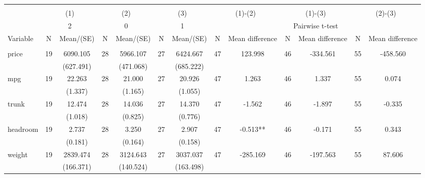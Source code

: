 
\begin{tabular}{@{\extracolsep{5pt}}lcccccccccccc}
\\[-1.8ex]\hline \hline \\[-1.8ex]
 & \multicolumn{2}{c}{(1)}  & \multicolumn{2}{c}{(2)}  & \multicolumn{2}{c}{(3)}  & \multicolumn{2}{c}{(1)-(2)} & \multicolumn{2}{c}{(1)-(3)} & \multicolumn{2}{c}{(2)-(3)} \\
 & \multicolumn{2}{c}{2}  & \multicolumn{2}{c}{0}  & \multicolumn{2}{c}{1}  & \multicolumn{6}{c}{Pairwise t-test}  \\
Variable & N & Mean/(SE) & N & Mean/(SE) & N & Mean/(SE) & N & Mean difference & N & Mean difference & N & Mean difference \\ \hline \\[-1.8ex] 
price   & 19    & 6090.105    & 28    & 5966.107    & 27    & 6424.667    & 47    & 123.998    & 46    & -334.561    & 55    & -458.560   \\
 &   & (627.491)  &   & (471.068)  &   & (685.222)  &   &  &   &  &   &  \\ [1ex]
mpg   & 19    & 22.263    & 28    & 21.000    & 27    & 20.926    & 47    & 1.263    & 46    & 1.337    & 55    & 0.074   \\
 &   & (1.337)  &   & (1.165)  &   & (1.055)  &   &  &   &  &   &  \\ [1ex]
trunk   & 19    & 12.474    & 28    & 14.036    & 27    & 14.370    & 47    & -1.562    & 46    & -1.897    & 55    & -0.335   \\
 &   & (1.018)  &   & (0.825)  &   & (0.776)  &   &  &   &  &   &  \\ [1ex]
headroom   & 19    & 2.737    & 28    & 3.250    & 27    & 2.907    & 47    & -0.513**    & 46    & -0.171    & 55    & 0.343   \\
 &   & (0.181)  &   & (0.164)  &   & (0.158)  &   &  &   &  &   &  \\ [1ex]
weight   & 19    & 2839.474    & 28    & 3124.643    & 27    & 3037.037    & 47    & -285.169    & 46    & -197.563    & 55    & 87.606   \\
 &   & (166.371)  &   & (140.524)  &   & (163.498)  &   &  &   &  &   &  \\ [1ex]

\end{tabular}

